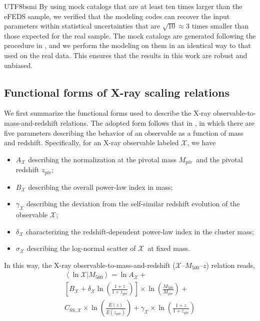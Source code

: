\documentclass[longauth]{aa}
\newcommand{\Mfiveoo}{\ensuremath{M_{500}}}
\newcommand{\redshift}{\ensuremath{z}}
\newcommand{\MPIV}{\ensuremath{M_{\mathrm{piv}}}}
\newcommand{\ZPIV}{\ensuremath{z_{\mathrm{piv}}}}
\newcommand{\Ez}{\ensuremath{E(z)}}
\newcommand{\Ezpiv}{\ensuremath{E(z_{\mathrm{piv}})}}
\newcommand{\Xlabel}{\ensuremath{\mathcal{X}}}
\begin{document}
\begin{CJK*}{UTF8}{bsmi}
By using mock catalogs that are at least ten times larger than the eFEDS sample, we verified that the modeling codes can recover the input parameters within statistical uncertainties that are $\sqrt{10}\approx3$ times smaller than those expected for the real sample.
The mock catalogs are generated following the procedure in \cite{grandis19}, and we perform the modeling on them in an identical way to that used on the real data.
This ensures that the results in this work are robust and unbiased.


\subsection{Functional forms of X-ray scaling relations}
\label{sec:functionalforms}

We first summarize the functional forms used to describe the X-ray observable-to-mass-and-redshift relations.
The adopted form follows that in \cite{bulbul19}, in which there are five parameters describing the behavior of an observable as a function of mass and redshift.
Specifically, for an X-ray observable labeled \Xlabel, we have
%
\begin{itemize}
\item $A_{\Xlabel}$ describing the normalization at the pivotal mass \MPIV\ and the pivotal redshift \ZPIV;
\item $B_{\Xlabel}$ describing the overall power-law index in mass;
\item $\gamma_{\Xlabel}$ describing the deviation from the self-similar redshift evolution \citep{kaiser1986} of the observable \Xlabel;
\item $\delta_{\Xlabel}$ characterizing the redshift-dependent power-law index in the cluster mass;
\item $\sigma_{\Xlabel}$ describing the log-normal scatter of \Xlabel\ at fixed mass.
\end{itemize}
%
In this way, the X-ray observable-to-mass-and-redshift (\Xlabel--\Mfiveoo--\redshift) relation reads,
%
\begin{multline}
\label{eq:x_to_mass}
\left\langle\ln\mathcal{X}|\Mfiveoo\right\rangle 
= \ln A_{\mathcal{X}} + \\
\left[ B_{\mathcal{X}} + \delta_{\mathcal{X}}\ln\left(\frac{1 + \redshift}{1 + \ZPIV}\right) \right] \times
\ln\left(\frac{\Mfiveoo}{\MPIV}\right) +
\\
C_{\mathrm{SS},\mathcal{X}} \times \ln\left(\frac{\Ez}{\Ezpiv}\right) + 
\gamma_{\mathcal{X}} \times 
\ln \left(\frac{1 + \redshift}{1 + \ZPIV}\right)

\end{multline}
\end{CJK*}
\end{document}
